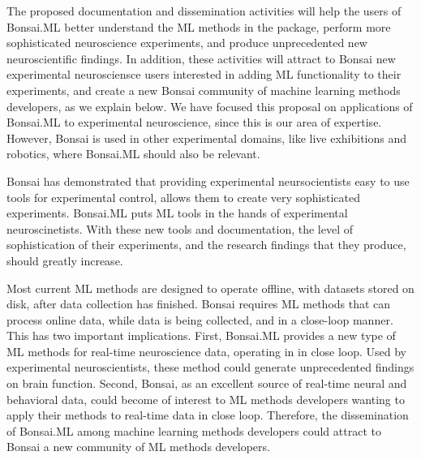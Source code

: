 The proposed documentation and dissemination activities will help the users of
Bonsai.ML better understand the ML methods in the package, perform more
sophisticated neuroscience experiments, and produce unprecedented new
neuroscientific findings.
%
In addition, these activities will attract to Bonsai new experimental
neurosciensce users interested in adding ML functionality to their experiments,
and create a new Bonsai community of machine learning methods developers, as we
explain below.
%
We have focused this proposal on applications of Bonsai.ML to experimental
neuroscience, since this is our area of expertise. However, Bonsai is used in
other experimental domains, like live exhibitions and robotics, where Bonsai.ML
should also be relevant.

Bonsai has demonstrated that providing experimental neursocientists easy to use
tools for experimental control, allows them to create very sophisticated
experiments.
%
Bonsai.ML puts ML tools in the hands of experimental neuroscinetists. With
these new tools and documentation, the level of sophistication of their
experiments, and the research findings that they produce, should greatly increase.

Most current ML methods are designed to operate offline, with datasets stored
on disk, after data collection has finished.
%
Bonsai requires ML methods that can process online data, while data is being
collected, and in a close-loop manner.
%
This has two important implications.
%
First, Bonsai.ML provides a new type of ML methods for real-time neuroscience
data, operating in in close loop. Used by experimental neuroscientists, these
method could generate unprecedented findings on brain function.
%
Second, Bonsai, as an excellent source of real-time neural and behavioral data,
could become of interest to ML methods developers wanting to apply their
methods to real-time data in close loop.
%
Therefore, the dissemination of Bonsai.ML among machine learning methods
developers could attract to Bonsai a new community of ML methods developers.
